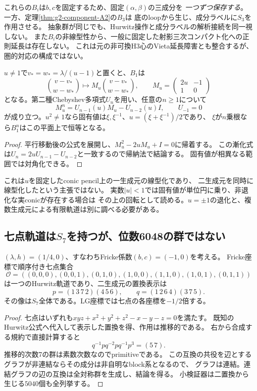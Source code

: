 これらの$B_i$は$b,c$を固定するため、固定$(\alpha,\beta)$の三成分を
\emph{一つずつ保存する}。一方、定理\ref{thm:g2-component-A2}の$B_3$は
底のloopから生じ、成分ラベルに$S_3$を作用させる。
抽象群が同じでも、Hurwitz操作と成分ラベルの解析接続を同一視しない。
また$B_i$の非線型性から、一般に固定した射影三次コンパクト化への正則延長は存在しない。
これは元の非可換H3心のVieta延長障害とも整合するが、圏的対応の構成ではない。

\begin{proposition}[一生成元の反復はChebyshev多項式で線型化される]
\label{prop:lg-twist-chebyshev}
$u\ne1$で$v_*=w_*=\lambda/(u-1)$と置くと、$B_1$は
\[
 \binom{v-v_*}{w-w_*}\longmapsto
 M_u\binom{v-v_*}{w-w_*},\qquad
 M_u=\begin{pmatrix}2u&-1\\1&0\end{pmatrix}
\]
となる。第二種Chebyshev多項式$U_n$を用い、任意の$n\ge1$について
\[
 M_u^n=U_{n-1}(u)M_u-U_{n-2}(u)I,
 \qquad U_{-1}=0
\]
が成り立つ。$u^2\ne1$なら固有値は$\xi,\xi^{-1}$、$u=(\xi+\xi^{-1})/2$であり、
$\xi$が$n$乗根なら$B_1^n$はこの平面上で恒等となる。
\end{proposition}
\begin{proof}
平行移動後の公式を展開し、$M_u^2-2uM_u+I=0$に帰着する。
この漸化式は$U_n=2uU_{n-1}-U_{n-2}$と一致するので帰納法で結論する。
固有値が相異なる範囲では対角化できる。
\end{proof}
これは$u$を固定したconic pencil上の一生成元の線型化であり、
二生成元を同時に線型化したという主張ではない。
実数$|u|<1$では固有値が単位円に乗り、非退化な実conicが存在する場合は
その上の回転として読める。$u=\pm1$の退化と、複数生成元による有限軌道は別に調べる必要がある。

\subsection{七点軌道は\texorpdfstring{$S_7$}{S7}を持つが、位数6048の群ではない}
\begin{proposition}[Klein軌道上の完全対称群]
\label{prop:klein-seven-S7}
$(\lambda,h)=(1/4,0)$、すなわちFricke係数$(b,c)=(-1,0)$を考える。
Fricke座標で順序付き七点集合
\[
 \mathcal O=((0,0,0),(0,0,1),(0,1,0),(1,0,0),
              (1,1,0),(1,0,1),(0,1,1))
\]
は一つのHurwitz軌道であり、二生成元の置換表示は
\[
 p=(1\,3\,7\,2)(4\,5\,6),\qquad
 q=(1\,2\,6\,4)(3\,7\,5).
\]
その像は$S_7$全体である。LG座標では七点の各座標を$-1/2$倍する。
\end{proposition}
\begin{proof}
七点はいずれも$xyz+x^2+y^2+z^2-x-y-z=0$を満たす。
既知のHurwitz公式へ代入して表示した置換を得、作用は推移的である。
右から合成する規約で直接計算すると
\[
 q^{-1}p q^{-2}p q^{-1}p^3=(5\,7).
\]
推移的次数7の群は素数次数なのでprimitiveである。
この互換の共役を辺とするグラフが非連結ならその成分は非自明なblock系となるので、
グラフは連結。連結グラフの辺の互換は全対称群を生成し、結論を得る。
小検証器は二置換から生じる$5040$個も全列挙する。
\end{proof}

